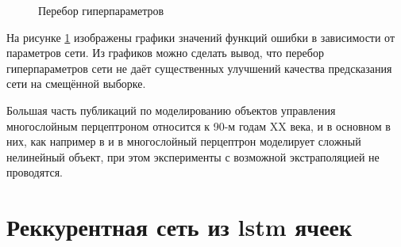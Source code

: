 \documentclass[12pt, oneside]{extbook}
\begin{document}
\begin{flushleft}
\begin{figure}[!ht]
{     }
     \caption{Перебор гиперпараметров}
     \label{fig:multi_perceptron_search}
\end{figure}
На рисунке \ref{fig:multi_perceptron_search} изображены графики значений функций ошибки в зависимости от параметров сети. Из графиков можно сделать вывод, что перебор гиперпараметров сети не даёт существенных улучшений качества предсказания сети на смещённой выборке.
\par
Большая часть публикаций по моделированию объектов управления многослойным перцептроном относится к 90-м годам XX века, и в основном в них, как например в \cite{fc90} и в \cite{fc90_2} многослойный перцептрон моделирует сложный нелинейный объект, при этом эксперименты с возможной экстраполяцией не проводятся.
\chapter{Реккурентная сеть из lstm ячеек}

\end{flushleft}
\end{document}
